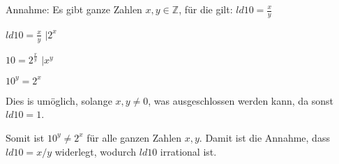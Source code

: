 \documentclass[../main.tex]{subfiles}
\begin{document}
\begin{enumerate}
\begin{enumerate}
				Annahme: Es gibt ganze Zahlen \( x,y \in \mathbb{Z} \), für die gilt:
				\( ld 10 = \frac{x}{y} \)

				\( ld 10 = \frac{x}{y} \) \( | 2^x \)

				\( 10 = 2^\frac{x}{y} \) \( | x^y \)

				\( 10^y = 2^x \)

				Dies is umöglich, solange \( x, y \neq 0 \), was ausgeschlossen werden kann, da sonst
				\( ld 10 = 1 \).

				Somit ist \( 10^y \neq 2^x \) für alle ganzen Zahlen \( x,y \). Damit ist die
				Annahme, dass \( ld 10 =  x / y  \) widerlegt, wodurch \( ld 10  \) irrational ist.
	      \end{enumerate}
\end{enumerate}
\end{document}
